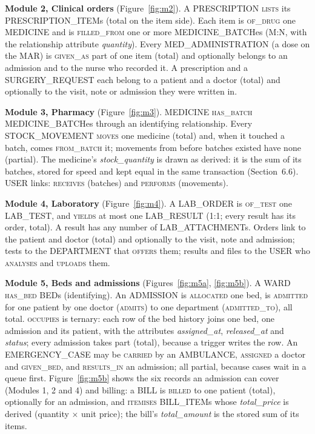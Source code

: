 \textbf{Module 2, Clinical orders} (Figure~\ref{fig:m2}). A PRESCRIPTION \textsc{lists} its PRESCRIPTION\_ITEMs
(total on the item side). Each item is \textsc{of\_drug} one MEDICINE and is \textsc{filled\_from} one or more
MEDICINE\_BATCHes (M:N, with the relationship attribute \emph{quantity}). Every MED\_ADMINISTRATION (a dose on the
MAR) is \textsc{given\_as} part of one item (total) and optionally belongs to an admission and to the nurse who
recorded it. A prescription and a SURGERY\_REQUEST each belong to a patient and a doctor (total) and optionally to
the visit, note or admission they were written in.

\textbf{Module 3, Pharmacy} (Figure~\ref{fig:m3}). MEDICINE \textsc{has\_batch} MEDICINE\_BATCHes through an
identifying relationship. Every STOCK\_MOVEMENT \textsc{moves} one medicine (total) and, when it touched a batch,
comes \textsc{from\_batch} it; movements from before batches existed have none (partial). The medicine's
\emph{stock\_quantity} is drawn as derived: it is the sum of its batches, stored for speed and kept equal in the
same transaction (Section~6.6). USER links: \textsc{receives} (batches) and \textsc{performs} (movements).

\textbf{Module 4, Laboratory} (Figure~\ref{fig:m4}). A LAB\_ORDER is \textsc{of\_test} one LAB\_TEST, and
\textsc{yields} at most one LAB\_RESULT (1:1; every result has its order, total). A result has any number of
LAB\_ATTACHMENTs. Orders link to the patient and doctor (total) and optionally to the visit, note and admission;
tests to the DEPARTMENT that \textsc{offers} them; results and files to the USER who \textsc{analyses} and
\textsc{uploads} them.

\textbf{Module 5, Beds and admissions} (Figures~\ref{fig:m5a}, \ref{fig:m5b}). A WARD \textsc{has\_bed} BEDs
(identifying). An ADMISSION is \textsc{allocated} one bed, is \textsc{admitted} for one patient by one doctor
(\textsc{admits}) to one department (\textsc{admitted\_to}), all total. \textsc{occupies} is ternary: each row of
the bed history joins one bed, one admission and its patient, with the attributes \emph{assigned\_at},
\emph{released\_at} and \emph{status}; every admission takes part (total), because a trigger writes the row.
An EMERGENCY\_CASE may be \textsc{carried} by an AMBULANCE, \textsc{assigned} a doctor and \textsc{given\_bed}, and
\textsc{results\_in} an admission; all partial, because cases wait in a queue first. Figure~\ref{fig:m5b} shows the
six records an admission can cover (Modules 1, 2 and 4) and billing: a BILL is \textsc{billed} to one patient
(total), optionally for an admission, and \textsc{itemises} BILL\_ITEMs whose \emph{total\_price} is derived
(quantity $\times$ unit price); the bill's \emph{total\_amount} is the stored sum of its items.

